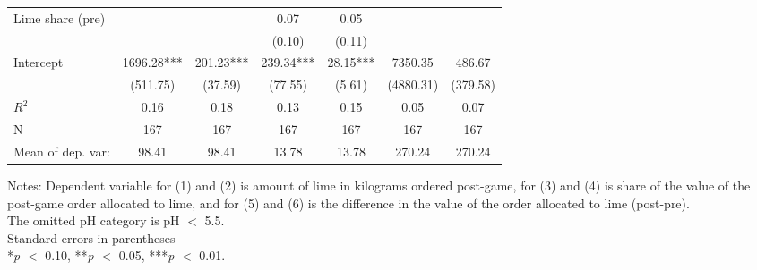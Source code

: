 \begin{table}[htbp]
\begin{threeparttable}
\begin{tabular}{l cccccc}
Lime share (pre)    &               &               &        0.07   &        0.05   &               &               \\
                    &               &               &      (0.10)   &      (0.11)   &               &               \\
Intercept           &     1696.28***&      201.23***&      239.34***&       28.15***&     7350.35   &      486.67   \\
                    &    (511.75)   &     (37.59)   &     (77.55)   &      (5.61)   &   (4880.31)   &    (379.58)   \\
\hline
$R^2$               &        0.16   &        0.18   &        0.13   &        0.15   &        0.05   &        0.07   \\
N                   &         167   &         167   &         167   &         167   &         167   &         167   \\
Mean of dep. var:   &       98.41   &       98.41   &       13.78   &       13.78   &      270.24   &      270.24   \\
\hline
\hline
\end{tabular}
\begin{tablenotes}
\footnotesize
\item{Notes: Dependent variable for (1) and (2) is amount of lime in kilograms ordered post-game, for (3) and (4) is share of the value of the post-game order allocated to lime, and for (5) and (6) is the difference in the value of the order allocated to lime (post-pre). \\ The omitted pH category is pH $<$ 5.5. \\ Standard errors in parentheses \\ *\textit{p} $<$ 0.10, **\textit{p} $<$ 0.05, ***\textit{p} $<$ 0.01.}
\end{tablenotes}
\end{threeparttable}
\end{table}

